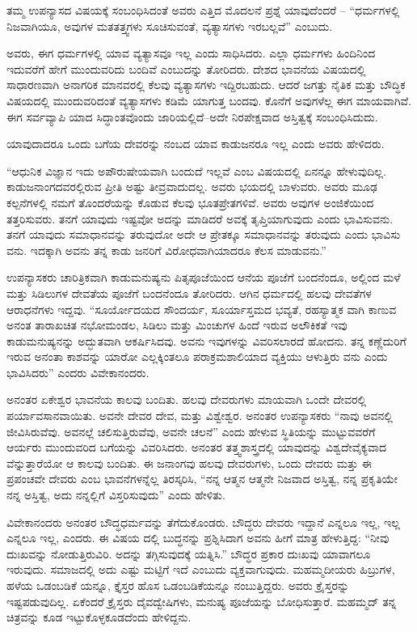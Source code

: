 ತಮ್ಮ ಉಪನ್ಯಾಸದ ವಿಷಯಕ್ಕೆ ಸಂಬಂಧಿಸಿದಂತೆ ಅವರು ಎತ್ತಿದ ಮೊದಲನೆ ಪ್ರಶ್ನೆ ಯಾವುದೆಂದರೆ – “ಧರ್ಮಗಳಲ್ಲಿ ನಿಜವಾಗಿಯೂ, ಅವುಗಳ ಮತತತ್ತ್ವಗಳು ಸೂಚಿಸುವಂತೆ, ವ್ಯತ್ಯಾಸಗಳು ಇರಬಲ್ಲವೆ” ಎಂಬುದು.

ಅವರು, ಈಗ ಧರ್ಮಗಳಲ್ಲಿ ಯಾವ ವ್ಯತ್ಯಾಸವೂ ಇಲ್ಲ ಎಂದು ಸಾಧಿಸಿದರು. ಎಲ್ಲಾ ಧರ್ಮಗಳು ಹಿಂದಿನಿಂದ ಇದುವರೆಗೆ ಹೇಗೆ ಮುಂದುವರಿದು ಬಂದಿವೆ ಎಂಬುದನ್ನು ತೋರಿದರು. ದೇಶದ ಭಾವನೆಯ ವಿಷಯದಲ್ಲಿ ಸಾಧಾರಣವಾಗಿ ಅನಾಗರಿಕ ಮಾನವರಲ್ಲಿ ಕೆಲವು ವ್ಯತ್ಯಾಸಗಳು ಇದ್ದಿರಬಹುದು. ಆದರೆ ಜಗತ್ತು ನೈತಿಕ ಮತ್ತು ಬೌದ್ಧಿಕ ವಿಷಯದಲ್ಲಿ ಮುಂದುವರಿದಂತೆ ವ್ಯತ್ಯಾಸಗಳು ಕಡಿಮೆ ಯಾಗುತ್ತ ಬಂದವು. ಕೊನೆಗೆ ಅವುಗಳೆಲ್ಲ ಈಗ ಮಾಯವಾಗಿವೆ. ಈಗ ಸರ್ವವ್ಯಾಪಿ ಯಾದ ಸಿದ್ಧಾಂತವೊಂದು ಜಾರಿಯಲ್ಲಿದೆ–ಅದೇ ನಿರಪೇಕ್ಷವಾದ ಅಸ್ತಿತ್ವಕ್ಕೆ ಸಂಬಂಧಿಸಿದುದು.

ಯಾವುದಾದರೂ ಒಂದು ಬಗೆಯ ದೇವರನ್ನು ನಂಬದ ಯಾವ ಕಾಡುಜನರೂ ಇಲ್ಲ ಎಂದು ಅವರು ಹೇಳಿದರು.

“ಆಧುನಿಕ ವಿಜ್ಞಾನ ಇದು ಅಪೌರುಷೇಯವಾಗಿ ಬಂದುದೆ ಇಲ್ಲವೆ ಎಂಬ ವಿಷಯದಲ್ಲಿ ಏನನ್ನೂ ಹೇಳುವುದಿಲ್ಲ. ಕಾಡುಜನಾಂಗದವರಲ್ಲಿರುವ ಪ್ರೀತಿ ಅಷ್ಟು ತೀವ್ರವಾದುದಲ್ಲ. ಅವರು ಭಯದಲ್ಲಿ ಬಾಳುವರು. ಅವರು ಮೂಢ ಕಲ್ಪನೆಗಳಲ್ಲಿ ನಮಗೆ ತೊಂದರೆಯನ್ನು ಕೊಡುವ ಕೆಲವು ಭೂತಪ್ರೇತಗಳಿವೆ. ಅವರು ಅವುಗಳ ಅಂಜಿಕೆಯಿಂದ ತತ್ತರಿಸುವರು. ತನಗೆ ಯಾವುದು ಇಷ್ಟವೋ ಅದನ್ನು ಮಾಡಿದರೆ ಅವಕ್ಕೆ ತೃಪ್ತಿಯಾಗುವುದು ಎಂದು ಭಾವಿಸುವನು. ತನಗೆ ಯಾವುದು ಸಮಾಧಾನವನ್ನು ತರುವುದೋ ಅದೇ ಆ ಪ್ರೇತಕ್ಕೂ ಸಮಾಧಾನವನ್ನು ತರುವುದು ಎಂದು ಭಾವಿಸು ವನು. ಇದಕ್ಕಾಗಿ ಅವನು ತನ್ನ ಕಾಡು ಜನರಿಗೆ ವಿರೋಧವಾಗಿಯಾದರೂ ಕೆಲಸ ಮಾಡುವನು.”

ಉಪನ್ಯಾಸಕರು ಚಾರಿತ್ರಿಕವಾಗಿ ಕಾಡುಮನುಷ್ಯನು ಪಿತೃಪೂಜೆಯಿಂದ ಆನೆಯ ಪೂಜೆಗೆ ಬಂದನೆಂದೂ, ಅಲ್ಲಿಂದ ಮಳೆ ಮತ್ತು ಸಿಡಿಲುಗಳ ದೇವತೆಯ ಪೂಜೆಗೆ ಬಂದನೆಂದೂ ತೋರಿದರು. ಆಗಿನ ಧರ್ಮದಲ್ಲಿ ಹಲವು ದೇವತೆಗಳ ಆರಾಧನೆಗಳು ಇದ್ದವು. “ಸೂರ್ಯೋದಯದ ಸೌಂದರ್ಯ, ಸೂರ್ಯಾಸ್ತಮದ ಭವ್ಯತೆ, ರಹಸ್ಯಾತ್ಮಕ ವಾಗಿ ಕಾಣುವ ಅನಂತ ತಾರಾಖಚಿತ ನಭೋಮಂಡಲ, ಸಿಡಿಲು ಮತ್ತು ಮಿಂಚುಗಳ ಹಿಂದೆ ಇರುವ ಅಲೌಕಿಕತೆ ಇವು ಕಾಡುಮನುಷ್ಯನನ್ನು ಅದ್ಭುತವಾಗಿ ಆಕರ್ಷಿಸಿದವು. ಅವನು ಇವುಗಳನ್ನು ವಿವರಿಸಲಾರದೆ ಹೋದನು. ತನ್ನ ಕಣ್ಣೆದುರಿಗೆ ಇರುವ ಅನಂತಾ ಕಾಶವನ್ನು ಯಾರೋ ಎಲ್ಲಕ್ಕಿಂತಲೂ ಪರಾಕ್ರಮಶಾಲಿಯಾದ ವ್ಯಕ್ತಿಯು ಆಳುತ್ತಿರು ವನು ಎಂದು ಭಾವಿಸಿದರು” ಎಂದರು ವಿವೇಕಾನಂದರು.

ಅನಂತರ ಏಕೇಶ್ವರ ಭಾವನೆಯ ಕಾಲವು ಬಂದಿತು. ಹಲವು ದೇವರುಗಳು ಮಾಯವಾಗಿ ಒಂದೇ ದೇವರಲ್ಲಿ ಪರ್ಯಾವಸಾನವಾಯಿತು. ಅವನೇ ದೇವರ ದೇವ, ಮತ್ತು ವಿಶ್ವೇಶ್ವರ. ಅನಂತರ ಉಪನ್ಯಾಸಕರು “ನಾವು ಅವನಲ್ಲಿ ಜೀವಿಸಿರುವೆವು. ಅವನಲ್ಲೆ ಚಲಿಸುತ್ತಿರುವೆವು, ಅವನೇ ಚಲನೆ” ಎಂದು ಹೇಳುವ ಸ್ಥಿತಿಯನ್ನು ಮುಟ್ಟುವವರೆಗೆ ಆರ್ಯರು ಮುಂದುವರಿದ ಬಗೆಯನ್ನು ವಿವರಿಸಿದರು. ಅನಂತರ ತತ್ತ್ವಶಾಸ್ತ್ರದಲ್ಲಿ ಯಾವುದನ್ನು ವಿಶ್ವದೇವೈಕ್ಯವಾದ  ವೆನ್ನುತ್ತಾರೆಯೋ ಆ ಕಾಲವು ಬಂದಿತು. ಈ ಜನಾಂಗವು ಹಲವು ದೇವರುಗಳು, ಒಂದು ದೇವರು ಮತ್ತು ಈ ಪ್ರಪಂಚವೇ ದೇವರು ಎಂಬ ಭಾವನೆಗಳನ್ನೆಲ್ಲ ತಿರಸ್ಕರಿಸಿ, “ನನ್ನ ಆತ್ಮನ ಆತ್ಮನೇ ನಿಜವಾದ ಅಸ್ತಿತ್ವ, ನನ್ನ ಪ್ರಕೃತಿಯೇ ನನ್ನ ಅಸ್ತಿತ್ವ, ಅದು ನನ್ನಲ್ಲಿಗೆ ವಿಸ್ತರಿಸುವುದು” ಎಂದು ಹೇಳಿತು.

ವಿವೇಕಾನಂದರು ಅನಂತರ ಬೌದ್ಧಧರ್ಮವನ್ನು ತೆಗೆದುಕೊಂಡರು. ಬೌದ್ಧರು ದೇವರು ಇದ್ದಾನೆ ಎನ್ನಲೂ ಇಲ್ಲ, ಇಲ್ಲ ಎನ್ನಲೂ ಇಲ್ಲ, ಎಂದರು. ಈ ವಿಷಯ ದಲ್ಲಿ ಬುದ್ಧನನ್ನು ಪ್ರಶ್ನಿಸಿದಾಗ ಅವನು ಹೀಗೆ ಮಾತ್ರ ಹೇಳುತ್ತಿದ್ದ: “ನೀವು ದುಃಖವನ್ನು ನೋಡುತ್ತಿರುವಿರಿ. ಅದನ್ನು ತಗ್ಗಿಸುವುದಕ್ಕೆ ಯತ್ನಿಸಿ.” ಬೌದ್ಧರ ಪ್ರಕಾರ ದುಃಖವು ಯಾವಾಗಲೂ ಇರುವುದು. ಸಮಾಜದಲ್ಲಿ ಅದು ಎಷ್ಟು ಮಟ್ಟಿಗೆ ಇದೆ ಎಂಬುದು ವ್ಯಕ್ತವಾಗುವುದು. ಮಹಮ್ಮದೀಯರು ಹಿಬ್ರುಗಳ, ಹಳೆಯ ಒಡಂಬಡಿಕೆ ಯನ್ನೂ, ಕ್ತೈಸ್ತರ ಹೊಸ ಒಡಂಬಡಿಕೆಯನ್ನೂ ನಂಬುತ್ತಿದ್ದರು. ಅವರು ಕ್ರೈಸ್ತರನ್ನು ಇಷ್ಟಪಡುವುದಿಲ್ಲ. ಏಕೆಂದರೆ ಕ್ರೈಸ್ತರು ದೈವದ್ವೇಷಿಗಳು, ಮನುಷ್ಯ ಪೂಜೆಯನ್ನು ಬೋಧಿಸುತ್ತಾರೆ. ಮಹಮ್ಮದ್​ ತನ್ನ ಚಿತ್ರವನ್ನು ಕೂಡ ಇಟ್ಟುಕೊಳ್ಳಕೂಡದೆಂದು ಹೇಳಿದ್ದನು.

